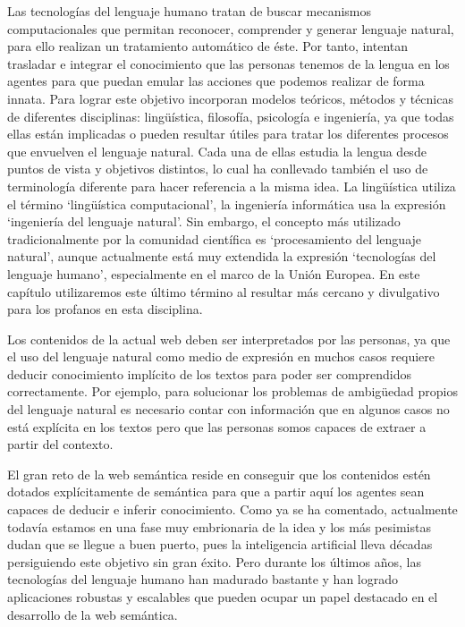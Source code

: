 Las tecnologías del lenguaje humano tratan de buscar mecanismos computacionales que permitan reconocer, comprender y generar lenguaje natural, para ello realizan un tratamiento automático de éste. Por tanto, intentan trasladar e integrar el conocimiento que las personas tenemos de la lengua en los agentes para que puedan emular las acciones que podemos realizar de forma innata. Para lograr este objetivo incorporan modelos teóricos, métodos y técnicas de diferentes disciplinas: lingüística, filosofía, psicología e ingeniería, ya que todas ellas están implicadas o pueden resultar útiles para tratar los diferentes procesos que envuelven el lenguaje natural. Cada una de ellas estudia la lengua desde puntos de vista y objetivos distintos, lo cual ha conllevado también el uso de terminología diferente para hacer referencia a la misma idea. La lingüística utiliza el término ‘lingüística computacional’, la ingeniería informática usa la expresión ‘ingeniería del lenguaje natural’. Sin embargo, el concepto más utilizado tradicionalmente por la comunidad científica es ‘procesamiento del lenguaje natural’, aunque actualmente está muy extendida la expresión ‘tecnologías del lenguaje humano’, especialmente en el marco de la Unión Europea. En este capítulo utilizaremos este último término al resultar más cercano y divulgativo para los profanos en esta disciplina.

Los contenidos de la actual web deben ser interpretados por las personas, ya que el uso del lenguaje natural como medio de expresión en muchos casos requiere deducir conocimiento implícito de los textos para poder ser comprendidos correctamente. Por ejemplo, para solucionar los problemas de ambigüedad propios del lenguaje natural es necesario contar con información que en algunos casos no está explícita en los textos pero que las personas somos capaces de extraer a partir del contexto.

El gran reto de la web semántica reside en conseguir que los contenidos estén dotados explícitamente de semántica para que a partir aquí los agentes sean capaces de deducir e inferir conocimiento. Como ya se ha comentado, actualmente todavía estamos en una fase muy embrionaria de la idea y los más pesimistas dudan que se llegue a buen puerto, pues la inteligencia artificial lleva décadas persiguiendo este objetivo sin gran éxito. Pero durante los últimos años, las tecnologías del lenguaje humano han madurado bastante y han logrado aplicaciones robustas y escalables que pueden ocupar un papel destacado en el desarrollo de la web semántica.

